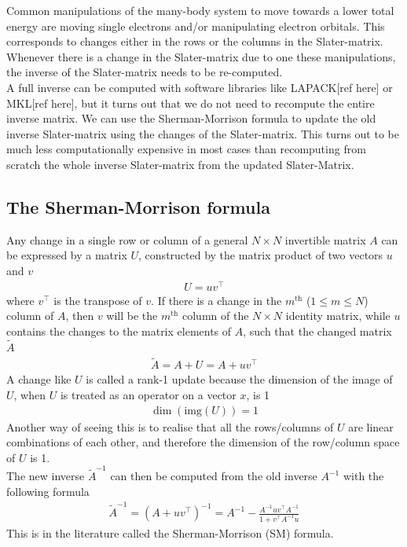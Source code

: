 \documentclass[11pt]{article}
\numberwithin{figure}{section}
\numberwithin{table}{section}
\begin{document}
			Common manipulations of the many-body system to move towards a lower total energy are moving single electrons and/or manipulating electron orbitals. This corresponds to changes either in the rows or the columns in the Slater-matrix. Whenever there is a change in the Slater-matrix due to one these manipulations, the inverse of the Slater-matrix needs to be re-computed.\\
			
			A full inverse can be computed with software libraries like LAPACK[ref here] or MKL[ref here], but it turns out that we do not need to recompute the entire inverse matrix. We can use the Sherman-Morrison formula to update the old inverse Slater-matrix using the changes of the Slater-matrix. This turns out to be much less computationally expensive in most cases than recomputing from scratch the whole inverse Slater-matrix from the updated Slater-Matrix.
			
		\subsection{The Sherman-Morrison formula}\label{sec:problem}
			
			Any change in a single row or column of a general $N\times N$ invertible matrix $A$ can be expressed by a matrix $U$, constructed by the matrix product of two vectors $u$ and $v$
			\begin{align}
				U=uv^\top
			\end{align}
			where $v^\top$ is the transpose of $v$.
			If there is a change in the $m^\mathrm{th}$ ($1\leq m\leq N$) column of $A$, then $v$ will be the $m^\mathrm{th}$ column of the $N\times N$ identity matrix, while $u$ contains the changes to the matrix elements of $A$, such that the changed matrix $\widetilde{A}$
			\begin{align}
				\widetilde{A} = A + U = A + uv^\top
			\end{align}
			A change like $U$ is called a rank-1 update because the dimension of the image of $U$, when $U$ is treated as an operator on a vector $x$, is 1
			\begin{align}
				\dim(\mathrm{img}(U))=1
			\end{align}
			Another way of seeing this is to realise that all the rows/columns of $U$ are linear combinations of each other, and therefore the dimension of the row/column space of $U$ is 1.\\
			
			The new inverse $\widetilde{A}^{-1}$ can then be computed from the old inverse $A^{-1}$ with the following formula
			\begin{align}
				\widetilde{A}^{-1}=\left(A+uv^\top\right)^{-1} = A^{-1} - \frac{A^{-1}uv^\top A^{-1}}{1+v^\top A^{-1}u}
			\end{align}
			This is in the literature called the Sherman-Morrison (SM) formula.
			
\end{document}
